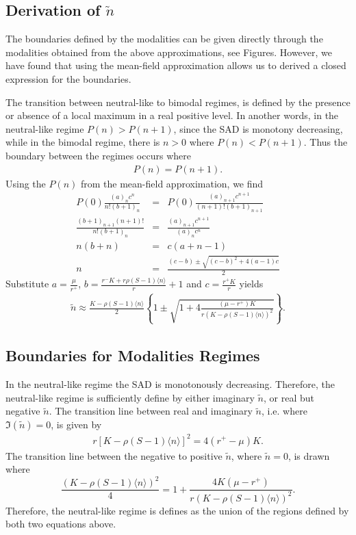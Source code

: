 \documentclass[9pt,twoside,lineno]{pnas-new}
\begin{document}
\subsection*{Derivation of $\tilde{n}$ } The boundaries defined by the modalities can be given directly through the modalities obtained from the above approximations, see Figures. However, we have found that using the mean-field approximation allows us to derived a closed expression for the boundaries.     

The transition between neutral-like to bimodal regimes, is defined by the presence  or absence of a local maximum in a real positive level. In another words, in the neutral-like regime $P(n)>P(n+1)$, since the SAD is monotony decreasing, while in the bimodal regime, there is $n>0$ where $P(n)<P(n+1)$. Thus the boundary between the regimes occurs where
  \begin{eqnarray}
      P(n)=P(n+1).
    \end{eqnarray}
Using the $P(n)$ from the mean-field approximation, we find
    \begin{eqnarray}
      P(0)\frac{(a)_n c^n}{n! (b+1)_n }&=&P(0) \frac{(a)_{n+1} c^{n+1}}{(n+1)! (b+1)_{n+1} } 
      \\
      \frac{(b+1)_{n+1}(n+1)!}{n! (b+1)_n }&=& \frac{(a)_{n+1} c^{n+1}}{(a)_n c^n } 
      \\
      n(b+n)&=& c (a+n-1)
      \\
      n&=& \frac{(c-b)\pm \sqrt{(c-b)^2+4(a-1)c}}{2}
  \end{eqnarray}
Substitute $a=\frac{\mu}{r^+}$, $b=\frac{r^- K + r \rho (S-1) \langle n \rangle }{r}+1$ and $c=\frac{r^+ K}{r}$ yields
\begin{eqnarray}
   \tilde{n}\approx
    \frac{K-\rho(S-1)\langle n\rangle}{2}\left\{1 \pm \sqrt{1+4\frac{(\mu-r^+) K}{r(K-\rho(S-1)\langle n\rangle)^2}}\right\}.
    \end{eqnarray}

   
\subsection*{Boundaries for Modalities Regimes}
In the neutral-like regime the SAD is monotonously decreasing. Therefore, the neutral-like regime is sufficiently define by either imaginary $\tilde{n}$, or real but negative $\tilde{n}$. The transition line between real and imaginary $\tilde{n}$, i.e. where $\Im(\tilde{n})=0$, is given by  
\begin{eqnarray}
    {r\left[K-\rho  (S-1)\langle n\rangle\right]^2}=4{(r^+-\mu) K}.
\end{eqnarray}
The transition line between the negative to positive $\tilde{n}$, where $\tilde{n}=0$, is drawn where
\begin{equation}
    \frac{(K-\rho(S-1)  \langle n\rangle)^2}{4}=1+ \frac{4K(\mu-r^+)}{r(K-\rho(S-1)  \langle n\rangle)^2}.
\end{equation}
Therefore, the neutral-like regime is defines as the union of the regions defined by both two equations above.
\end{document}
